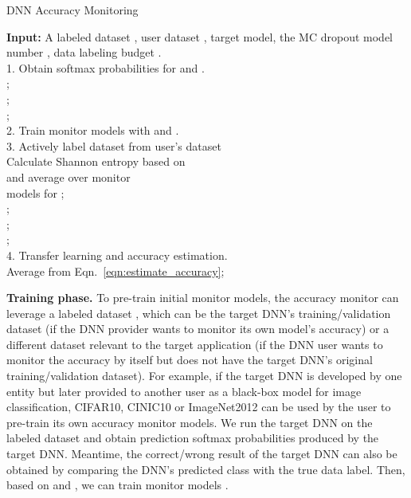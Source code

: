 \documentclass{article}
\newcommand{\cloudModel}{target model\xspace}
\newcommand{\monitors}{monitor models\xspace}
\begin{document}
\begin{algorithm}[!t]
	\caption{DNN Accuracy Monitoring}
	\textbf{Input: }
	A labeled dataset , user dataset , \cloudModel , the MC dropout model number ,
data labeling budget .\\
	1. Obtain softmax probabilities for  and .\\
	\text{\quad\quad};\\
	\text{\quad\quad};\\
	\text{\quad\quad};\\
	2. Train \monitors with  and .\\
	3. Actively label dataset  from user's dataset \\
	\text{\quad\quad}Calculate Shannon entropy  based on\\
\text{\quad\quad} and average over  monitor\\
\text{\quad\quad} models  for
;\\
    \text{\quad\quad};\\
	\text{\quad\quad};\\
	\text{\quad\quad};\\
	4. Transfer learning and accuracy estimation. \\
	\Return Average  from Eqn.~\eqref{eqn:estimate_accuracy};
	\label{algo:monitor_algorithm}
\end{algorithm}

\textbf{Training phase.}
To pre-train initial monitor models,
the accuracy monitor
can leverage a labeled dataset ,
which can be the target DNN's training/validation dataset
(if the DNN provider wants to monitor its own model's
accuracy)
or a different dataset relevant to the target application
(if the DNN user wants to monitor the
accuracy by itself but does not have the target DNN's original
training/validation dataset).
For example, if the target
DNN is developed by one entity
but later provided to another user as a black-box model
for image classification,
 CIFAR10, CINIC10 or ImageNet2012 can be used by
 the user to pre-train its own accuracy monitor models. We run
  the target DNN on the labeled dataset and obtain prediction softmax probabilities 
 produced by the target DNN. Meantime, the correct/wrong
 result   of the target DNN
 can also be obtained by comparing the DNN's predicted class
 with the true data label. Then, based on  and  ,
 we can train  monitor models .
\end{document}
